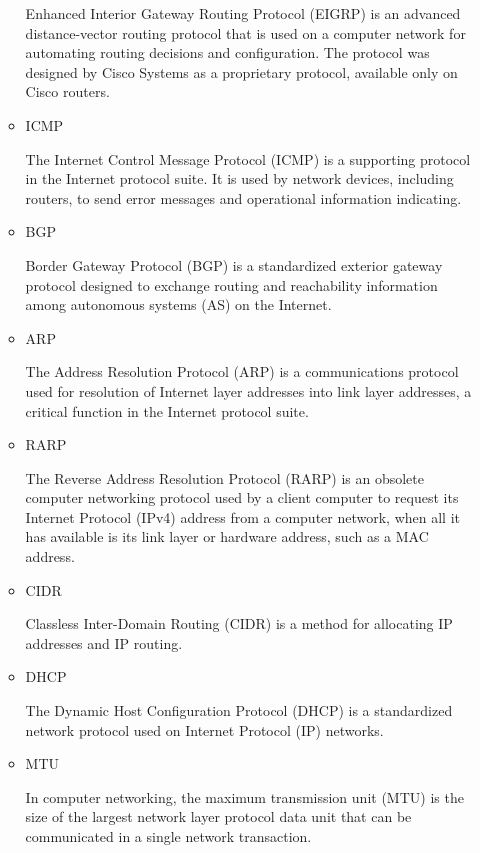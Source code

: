 \begin{enumerate}
\begin{itemize}
        Enhanced Interior Gateway Routing Protocol (EIGRP) is an advanced distance-vector routing protocol that is used on a computer network for automating routing decisions and configuration. The protocol was designed by Cisco Systems as a proprietary protocol, available only on Cisco routers.

        \item ICMP

        The Internet Control Message Protocol (ICMP) is a supporting protocol in the Internet protocol suite. It is used by network devices, including routers, to send error messages and operational information indicating.

        \item BGP

        Border Gateway Protocol (BGP) is a standardized exterior gateway protocol designed to exchange routing and reachability information among autonomous systems (AS) on the Internet.

        \item ARP

        The Address Resolution Protocol (ARP) is a communications protocol used for resolution of Internet layer addresses into link layer addresses, a critical function in the Internet protocol suite.

        \item RARP

        The Reverse Address Resolution Protocol (RARP) is an obsolete computer networking protocol used by a client computer to request its Internet Protocol  (IPv4) address from a computer network, when all it has available is its link layer or hardware address, such as a MAC address.

        \item CIDR

        Classless Inter-Domain Routing (CIDR) is a method for allocating IP addresses and IP routing.

        \item DHCP

        The Dynamic Host Configuration Protocol (DHCP) is a standardized network protocol used on Internet Protocol (IP) networks.

        \item MTU

        In computer networking, the maximum transmission unit (MTU) is the size of the largest network layer protocol data unit that can be communicated in a single network transaction.        
    \end{itemize}


\end{enumerate}
